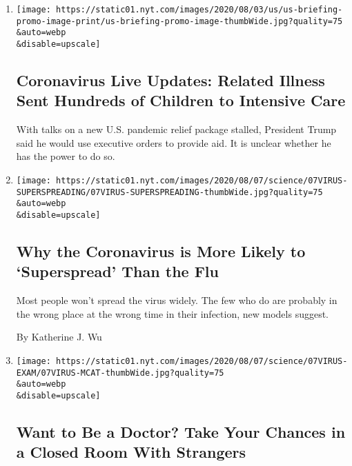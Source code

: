 \begin{enumerate}
\def\labelenumi{\arabic{enumi}.}
\item
  \href{/2020/08/08/world/coronavirus-updates.html}{}

  \texttt{[image: https://static01.nyt.com/images/2020/08/03/us/us-briefing-promo-image-print/us-briefing-promo-image-thumbWide.jpg?quality=75\\\&auto=webp\\\&disable=upscale]}

  \hypertarget{coronavirus-live-updates-related-illness-sent-hundreds-of-children-to-intensive-care}{%
  \subsection{Coronavirus Live Updates: Related Illness Sent Hundreds of
  Children to Intensive
  Care}\label{coronavirus-live-updates-related-illness-sent-hundreds-of-children-to-intensive-care}}

  With talks on a new U.S. pandemic relief package stalled, President
  Trump said he would use executive orders to provide aid. It is unclear
  whether he has the power to do so.
\item
  \href{/2020/08/07/health/coronavirus-superspreading-contagion.html}{}

  \texttt{[image: https://static01.nyt.com/images/2020/08/07/science/07VIRUS-SUPERSPREADING/07VIRUS-SUPERSPREADING-thumbWide.jpg?quality=75\\\&auto=webp\\\&disable=upscale]}

  \hypertarget{why-the-coronavirus-is-more-likely-to-superspread-than-the-flu}{%
  \subsection{Why the Coronavirus is More Likely to `Superspread' Than
  the
  Flu}\label{why-the-coronavirus-is-more-likely-to-superspread-than-the-flu}}

  Most people won't spread the virus widely. The few who do are probably
  in the wrong place at the wrong time in their infection, new models
  suggest.

  By Katherine J. Wu
\item
  \href{/2020/08/07/health/coronavirus-exams-mcat.html}{}

  \texttt{[image: https://static01.nyt.com/images/2020/08/07/science/07VIRUS-EXAM/07VIRUS-MCAT-thumbWide.jpg?quality=75\\\&auto=webp\\\&disable=upscale]}

  \hypertarget{want-to-be-a-doctor-take-your-chances-in-a-closed-room-with-strangers}{%
  \subsection{Want to Be a Doctor? Take Your Chances in a Closed Room
  With
  Strangers}\label{want-to-be-a-doctor-take-your-chances-in-a-closed-room-with-strangers}}


\end{enumerate}
